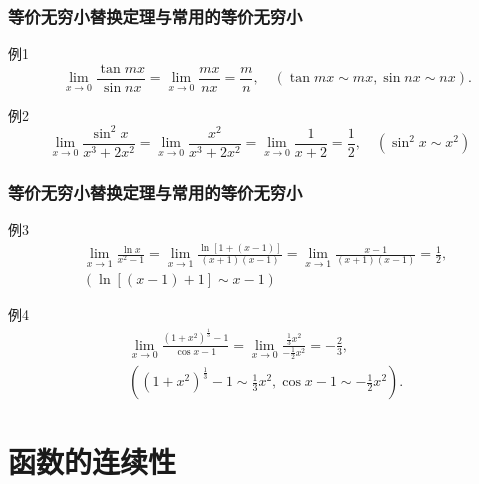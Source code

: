 \documentclass[
10pt,
aspectratio=43,
]{beamer}
\begin{document}
\begin{frame}
	\frametitle{等价无穷小替换定理与常用的等价无穷小}
	\begin{exampleblock}{例1}
		$$ \quad \lim _{x \rightarrow 0} \frac{\tan m x}{\sin n x}=\lim _{x \rightarrow 0} \frac{m x}{n x}=\frac{m}{n}, \quad(\tan m x \sim m x, \sin n x\sim n x).$$
	\end{exampleblock}
	\pause
	\begin{exampleblock}{例2}
		$$ \lim _{x \rightarrow 0} \frac{\sin ^2 x}{x^3+2 x^2}=\lim _{x \rightarrow 0} \frac{x^2}{x^3+2 x^2}=\lim _{x \rightarrow 0} \frac{1}{x+2}=\frac{1}{2}, \quad\left(\sin ^2 x \sim x^2\right)$$
	\end{exampleblock}
\end{frame}
\begin{frame}
	\frametitle{等价无穷小替换定理与常用的等价无穷小}
	\begin{exampleblock}{例3}
		\begin{equation*}
			\begin{aligned}
				  & \lim _{x \rightarrow 1} \frac{\ln x}{x^2-1}=\lim _{x \rightarrow 1} \frac{\ln [1+(x-1)]}{(x+1)(x-1)}=\lim _{x \rightarrow 1} \frac{x-1}{(x+1)(x-1)}=\frac{1}{2}, \\
				  & (\ln [(x-1)+1] \sim x-1)                                                                                                                                         
			\end{aligned}
		\end{equation*}
	\end{exampleblock}
	\pause
	\begin{exampleblock}{例4} \begin{equation*}
		\begin{aligned}
			  & \lim _{x \rightarrow 0} \frac{\left(1+x^2\right)^{\frac{1}{3}}-1}{\cos x-1}=\lim _{x \rightarrow 0} \frac{\frac{1}{3} x^2}{-\frac{1}{2} x^2}= -\frac{2}{3}, \\
			  & \left(\left(1+x^2\right)^{\frac{1}{3}}-1 \sim \frac{1}{3} x^2, \cos x-1 \sim-\frac{1}{2} x^2\right).
		\end{aligned}
		\end{equation*}
	\end{exampleblock}
\end{frame}

\section{函数的连续性}
\end{document}
